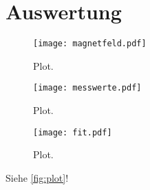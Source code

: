 \section{Auswertung}
\label{sec:Auswertung}

\begin{figure}
  \centering
  \texttt{[image: magnetfeld.pdf]}
  \caption{Plot.}
  \label{fig:magnetfeld}
\end{figure}

\begin{figure}
  \centering
  \texttt{[image: messwerte.pdf]}
  \caption{Plot.}
  \label{fig:messwerte}
\end{figure}

\begin{figure}
  \centering
  \texttt{[image: fit.pdf]}
  \caption{Plot.}
  \label{fig:fit}
\end{figure}


Siehe \autoref{fig:plot}!
